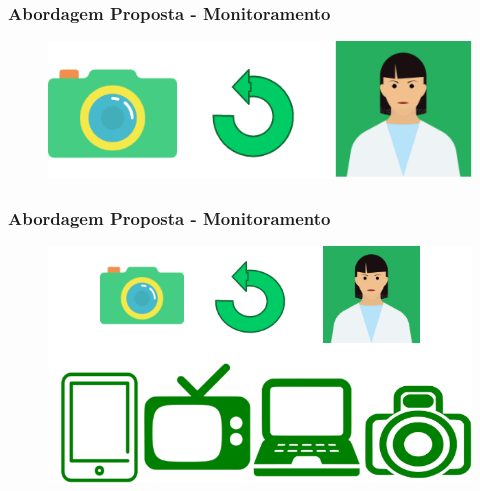\documentclass{beamer}
\begin{document}


\begin{frame}
\frametitle{Abordagem Proposta - Monitoramento }
\begin{figure}
\centering
\includegraphics[scale=0.37]{figuras/monitoramento_1.png}
\label{fig:arquitetura1}
\end{figure}
\end{frame}


\begin{frame}
\frametitle{Abordagem Proposta - Monitoramento }
\begin{figure}
\centering
\includegraphics[scale=0.37]{figuras/monitoramento_2.png}
\label{fig:arquitetura1}
\end{figure}
\end{frame}
\end{document}
